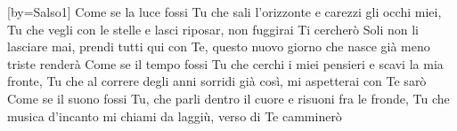 [by={Salso1}]
\beginverse
Come se la luce fossi Tu
che sali l'orizzonte e carezzi gli occhi miei,
Tu che vegli con le stelle e lasci riposar,
non fuggirai Ti cercherò
\endverse
\beginchorus
Soli non li lasciare mai,
prendi tutti qui con Te,
questo nuovo giorno che nasce già meno triste renderà
\endchorus
\beginverse
Come se il tempo fossi Tu
che cerchi i miei pensieri e scavi la mia fronte,
Tu che al correre degli anni sorridi già così,
mi aspetterai con Te sarò
Come se il suono fossi Tu,
che parli dentro il cuore e risuoni fra le fronde,
Tu che musica d'incanto mi chiami da laggiù,
verso di Te camminerò
\endverse
\endsong
